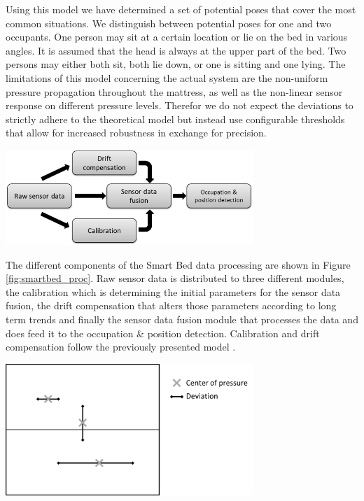 Using this model we have determined a set of potential poses that cover the most common situations. We distinguish between potential poses for one and two occupants. One person may sit at a certain location or lie on the bed in various angles. It is assumed that the head is always at the upper part of the bed. Two persons may either both sit, both lie down, or one is sitting and one lying. 
The limitations of this model concerning the actual system are the non-uniform pressure propagation throughout the mattress, as well as the non-linear sensor response on different pressure levels. Therefor we do not expect the deviations to strictly adhere to the theoretical model but instead use configurable thresholds that allow for increased robustness in exchange for precision.

\begin{minipage}{\linewidth}
\centering
\includegraphics[width=0.7\textwidth]{images/smartbed_proc}
\label{fig:smartbed_proc}
\end{minipage}

The different components of the Smart Bed data processing are shown in Figure \ref{fig:smartbed_proc}. Raw sensor data is distributed to three different modules, the calibration which is determining the initial parameters for the sensor data fusion, the drift compensation that alters those parameters according to long term trends and finally the sensor data fusion module that processes the data and does feed it to the occupation \& position detection. Calibration and drift compensation follow the previously presented model \cite{braun2012context}. 

\begin{minipage}{\linewidth}
\centering
\includegraphics[width=0.7\textwidth]{images/smartbed_cog}
\label{fig:smartbed_cog}
\end{minipage}

